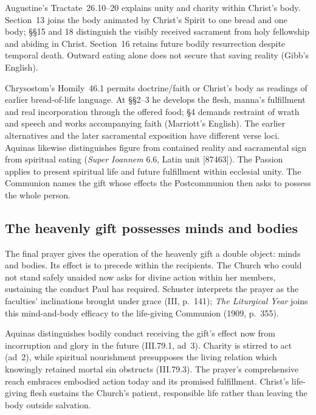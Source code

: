 Augustine's Tractate~26.10--20 explains unity and charity within Christ's
body. Section~13 joins the body animated by Christ's Spirit to one bread
and one body; §§15 and 18 distinguish the visibly received sacrament from
holy fellowship and abiding in Christ. Section~16 retains future bodily
resurrection despite temporal death. Outward eating alone does not secure
that saving reality (Gibb's English).

Chrysostom's Homily~46.1 permits doctrine/faith or Christ's body as readings
of earlier bread-of-life language. At §§2--3 he develops the flesh,
manna's fulfillment and real incorporation through the offered food;
§4 demands restraint of wrath and speech and works accompanying faith
(Marriott's English). The earlier alternatives and the later sacramental
exposition have different verse loci. Aquinas likewise distinguishes
figure from contained reality and sacramental sign from spiritual eating
(\emph{Super Ioannem} 6.6, Latin unit [87463]). The Passion applies to
present spiritual life and future fulfillment within ecclesial unity.
The Communion names the gift whose effects the Postcommunion then asks to
possess the whole person.

\subsection*{The heavenly gift possesses minds and bodies\enspace{}}

The final prayer gives the operation of the heavenly gift a double object:
minds and bodies. Its effect is to precede  within
the recipients. The Church who could not stand safely unaided now asks
for divine action within her members, sustaining the conduct Paul has
required. Schuster interprets the prayer as the faculties' inclinations
brought under grace (III, p.~141); \emph{The Liturgical Year} joins this
mind-and-body efficacy to the life-giving Communion (1909, p.~355).

Aquinas distinguishes bodily conduct receiving the gift's effect now from
incorruption and glory in the future (III.79.1, ad~3). Charity is stirred
to act (ad~2), while spiritual nourishment presupposes the living relation
which knowingly retained mortal sin obstructs (III.79.3).
The prayer's comprehensive reach embraces embodied action today and its
promised fulfillment. Christ's life-giving flesh sustains the Church's
patient, responsible life rather than leaving the body outside salvation.

